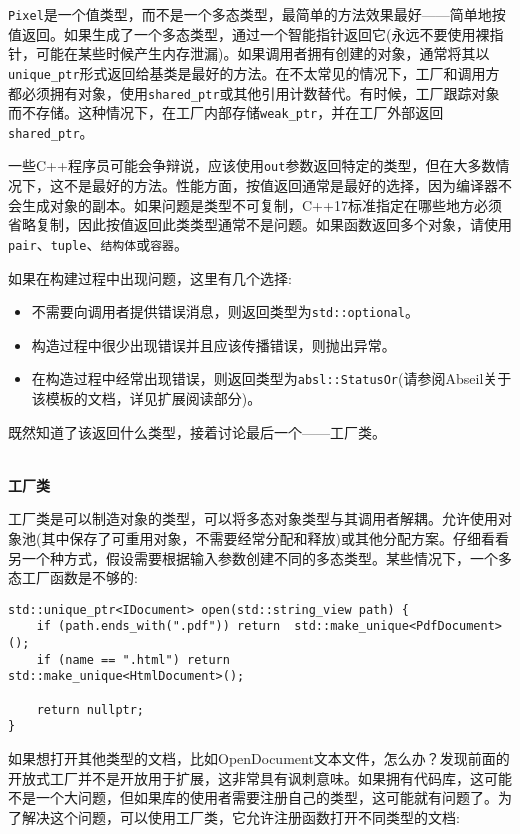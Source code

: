 \texttt{Pixel}是一个值类型，而不是一个多态类型，最简单的方法效果最好——简单地按值返回。如果生成了一个多态类型，通过一个智能指针返回它(永远不要使用裸指针，可能在某些时候产生内存泄漏)。如果调用者拥有创建的对象，通常将其以\texttt{unique\_ptr}形式返回给基类是最好的方法。在不太常见的情况下，工厂和调用方都必须拥有对象，使用\texttt{shared\_ptr}或其他引用计数替代。有时候，工厂跟踪对象而不存储。这种情况下，在工厂内部存储\texttt{weak\_ptr}，并在工厂外部返回\texttt{shared\_ptr}。

一些C++程序员可能会争辩说，应该使用\texttt{out}参数返回特定的类型，但在大多数情况下，这不是最好的方法。性能方面，按值返回通常是最好的选择，因为编译器不会生成对象的副本。如果问题是类型不可复制，C++17标准指定在哪些地方必须省略复制，因此按值返回此类类型通常不是问题。如果函数返回多个对象，请使用\texttt{pair}、\texttt{tuple}、\texttt{结构体}或\texttt{容器}。

如果在构建过程中出现问题，这里有几个选择:

\begin{itemize}
\item 
不需要向调用者提供错误消息，则返回类型为\texttt{std::optional}。

\item 
构造过程中很少出现错误并且应该传播错误，则抛出异常。

\item 
在构造过程中经常出现错误，则返回类型为\texttt{absl::StatusOr}(请参阅Abseil关于该模板的文档，详见扩展阅读部分)。
\end{itemize}

既然知道了该返回什么类型，接着讨论最后一个——工厂类。

\hspace*{\fill} \\ %
\noindent
\textbf{工厂类}

工厂类是可以制造对象的类型，可以将多态对象类型与其调用者解耦。允许使用对象池(其中保存了可重用对象，不需要经常分配和释放)或其他分配方案。仔细看看另一个种方式，假设需要根据输入参数创建不同的多态类型。某些情况下，一个多态工厂函数是不够的:

\begin{lstlisting}[style=styleCXX]
std::unique_ptr<IDocument> open(std::string_view path) {
	if (path.ends_with(".pdf")) return 	std::make_unique<PdfDocument>();
	if (name == ".html") return 			std::make_unique<HtmlDocument>();
	
	return nullptr;
}
\end{lstlisting}

如果想打开其他类型的文档，比如OpenDocument文本文件，怎么办？发现前面的开放式工厂并不是开放用于扩展，这非常具有讽刺意味。如果拥有代码库，这可能不是一个大问题，但如果库的使用者需要注册自己的类型，这可能就有问题了。为了解决这个问题，可以使用工厂类，它允许注册函数打开不同类型的文档:

